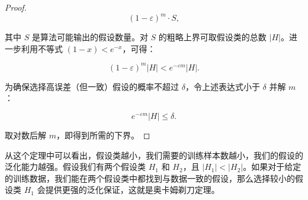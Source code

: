 \documentclass[lang=cn,newtx,10pt,scheme=chinese,chinesefont=nofont,citestyle=gb7714-2015, bibstyle=gb7714-2015]{elegantbook}
\begin{document}
\begin{refsection}
\begin{proof}
    \[
    (1 - \varepsilon)^m \cdot S,
    \]

    其中 \(S\) 是算法可能输出的假设数量。对 \(S\) 的粗略上界可取假设类的总数 \(|H|\)。进一步利用不等式 \((1 - x) < e^{-x}\)，可得：

    \[
    (1 - \varepsilon)^m |H| < e^{-\varepsilon m} |H|.
    \]

    为确保选择高误差（但一致）假设的概率不超过 \(\delta\)，令上述表达式小于 \(\delta\) 并解 \(m\)：

    \[
    e^{-\varepsilon m} |H| \leq \delta.
    \]

    取对数后解 \(m\)，即得到所需的下界。
\end{proof}
从这个定理中可以看出，假设类越小，我们需要的训练样本数越小，我们的假设的泛化能力越强。假设我们有两个假设类 \( H_1 \) 和 \( H_2 \)，且 \( |H_1| < |H_2| \)。如果对于给定的训练数据，我们能在两个假设类中都找到与数据一致的假设，那么选择较小的假设类 \( H_1 \) 会提供更强的泛化保证，这就是奥卡姆剃刀定理。


\end{refsection}
\end{document}
